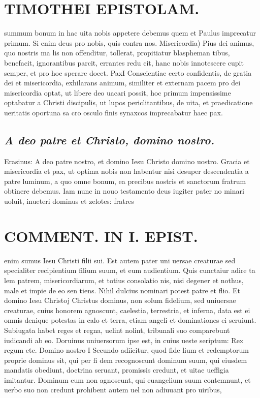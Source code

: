 \documentclass{article}
\begin{document}
\begin{pages}
\section*{TIMOTHEI EPISTOLAM. }
\marginpar{[ p.9 ]}\pstart summum bonum in hac uita nobis appetere debemus quem et Paulus imprecatur primum. Si enim deus pro nobis, quis contra nos.  \pend\pstart Misericordia) Pius dei animus, quo nostris ma lis non offenditur, tollerat, propitiatur blaspheman tibus, benefacit, ignorantibus parcit, errantes redu cit, hanc nobis innotescere cupit semper, et pro hoc sperare docet.  \pend\pstart PaxI Conscientiae certo confidentis, de gratia dei et misericordia, exhilarans animum, similiter et externam pacem pro dei misericordia optat, ut libere deo uacari possit, hoc primum impensissime optabatur a Christi discipulis, ut lupos periclitantibus, de uita, et praedicatione ueritatis oportuna sa cro osculo finis synaxcos imprecabatur haec pax.  \pend
{}
{}
\subsection*{\textit{A deo patre et Christo, domino nostro. }}\pstart Erasinus: A deo patre nostro, et domino Iesu Christo domino uostro.  \pend\pstart Gracia et misericordia et pax, ut optima nobis non habentur nisi desuper descendentia a patre luminum, a quo omne bonum, ea precibus nostris et sanctorum fratrum obtinere debemus.  \pend\pstart Iam nunc in nouo testamento deus iugiter pater no minari uoluit, inueteri dominus et zelotes: fratres  \pend
\section*{COMMENT. IN I. EPIST. }
\marginpar{[ p.10 ]}\pstart enim sumus Iesu Christi filii sui. Est autem pater uni uersae creaturae sed specialiter recipientium filium suum, et eum audientium. Quis cunctaiur adire ta lem patrem, misericordiarum, et totius consolatio nis, nisi degener et nothus, male et impie de eo sen tiens. Nihil dulcius nominari potest patre et flio.  \pend\pstart Et domino Iesu Christoj Christus dominus, non solum fidelium, sed uniuersae creaturae, cuius honorem agnoscunt, caelestia, terrestria, et inferna, data est ei omnis denique potestas in calo et terra, etiam angeli et dominationes ei seruiunt. Subiugata habet reges et regna, uelint nolint, tribunali suo comparebunt iudicandi ab eo. Doruinus uniuersorum ipse est, in cuius ueste seriptum: Rex regum etc.  \pend\pstart Domino nostro I Secundo adiicitur, quod fide lium et redemptorum proprie dominus sit, qui per fi dem recognoscunt dominum suum, qui eiusdem mandatis obediunt, doctrina seruant, promissis credunt, et uitae ueffigia imitantur. Dominum eum non agnoscunt, qui euangelium suum contemnunt, et uerbo suo non credunt prohibent autem uel non adiuuant pro uiribus,  \pend
{}
{}

\end{pages}
\end{document}
